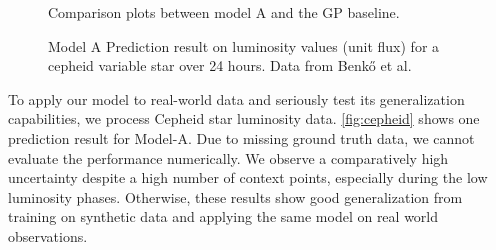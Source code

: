\begin{figure}
	\centering
	\resizebox{0.5\textwidth}{!}{
		
	}
	\caption{Comparison plots between model A and the GP baseline.}
	\label{fig:gp_comp}
\end{figure}

\begin{figure}
	\centering
	\resizebox{0.4\textwidth}{!}{
		
	}
	\caption{Model A Prediction result on luminosity values (unit flux) for a cepheid variable star over 24 hours. Data from Benkő et al. \cite{Benk__2014}}
	\label{fig:cepheid}
\end{figure}

To apply our model to real-world data and seriously test its generalization capabilities, we process Cepheid star luminosity data. \autoref{fig:cepheid} shows one prediction result for Model-A. Due to missing ground truth data, we cannot evaluate the performance numerically. We observe a comparatively high uncertainty despite a high number of context points, especially during the low luminosity phases. Otherwise, these results show good generalization from training on synthetic data and applying the same model on real world observations.

